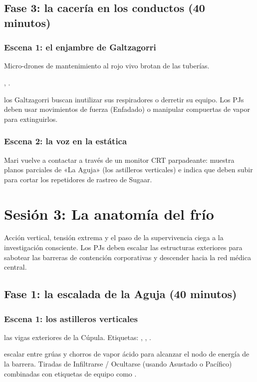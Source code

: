 \subsection{Fase 3: la cacería en los conductos (40 minutos)}

\subsubsection{Escena 1: el enjambre de Galtzagorri}
Micro-drones de mantenimiento al rojo vivo brotan de las tuberías.\par
{} , .\par
{} los Galtzagorri buscan inutilizar sus respiradores o derretir su equipo. Los PJs deben usar movimientos de fuerza (Enfadado) o manipular compuertas de vapor para extinguirlos.

\subsubsection{Escena 2: la voz en la estática}
Mari vuelve a contactar a través de un monitor CRT parpadeante: muestra planos parciales de «La Aguja» (los astilleros verticales) e indica que deben subir para cortar los repetidores de rastreo de Sugaar.

\section{Sesión 3: La anatomía del frío}


 Acción vertical, tensión extrema y el paso de la supervivencia ciega a la investigación consciente. Los PJs deben escalar las estructuras exteriores para sabotear las barreras de contención corporativas y descender hacia la red médica central.

\subsection{Fase 1: la escalada de la Aguja (40 minutos)}

\subsubsection{Escena 1: los astilleros verticales}
 las vigas exteriores de la Cúpula. Etiquetas: , , .\par
{} escalar entre grúas y chorros de vapor ácido para alcanzar el nodo de energía de la barrera. Tiradas de Infiltrarse / Ocultarse (usando Asustado o Pacífico) combinadas con etiquetas de equipo como .

